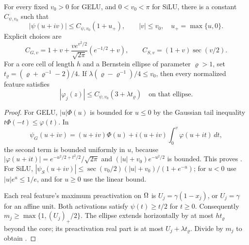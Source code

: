 \begin{lemma}
\label{lem:psi-strip-growth}
For every fixed $v_0>0$ for GELU, and $0<v_0<\pi$ for SiLU, there is a
constant $C_{\psi,v_0}$ such that
\begin{equation}
 |\psi(u+iv)|\le C_{\psi,v_0}(1+u_+),\qquad |v|\le v_0,
 \quad u_+=\max\{u,0\}.
 \label{eq:psi-strip-growth}
\end{equation}
Explicit choices are
\begin{equation}
 C_{G,v}=1+v+\frac{v e^{v^2/2}}{\sqrt{2\pi}}(e^{-1/2}+v),
 \qquad C_{S,v}=(1+v)\sec(v/2).
 \label{eq:psi-strip-constants}
\end{equation}
For a core cell of length $h$ and a Bernstein ellipse of parameter
$\varrho>1$, set $t_\varrho=(\varrho+\varrho^{-1}-2)/4$.
If $\lambda(\varrho-\varrho^{-1})/4\le v_0$, then every normalized feature
satisfies
\begin{equation}
 |\varphi_j(z)|\le C_{\psi,v_0}(3+\lambda t_\varrho)
 \quad\text{on that ellipse}.
 \label{eq:psi-ellipse-bound}
\end{equation}
\end{lemma}
\begin{proof}
For GELU, $|u|\Phi(u)$ is bounded for $u\le0$ by the Gaussian tail
inequality $t\Phi(-t)\le\varphi(t)$. In
\[
 \psi_G(u+iv)=(u+iv)\Phi(u)
        +i(u+iv)\int_0^v\varphi(u+it)\,dt,
\]
the second term is bounded uniformly in $u$, because
$|\varphi(u+it)|=e^{-u^2/2+t^2/2}/\sqrt{2\pi}$ and
$(|u|+v_0)e^{-u^2/2}$ is bounded. This proves .
For SiLU,
$|\psi_S(u+iv)|\le\sec(v_0/2)(|u|+v_0)/(1+e^{-u})$;
for $u<0$ use $|u|e^{u}\le1/e$, and for $u\ge0$ use the linear bound.

Each real feature's maximum preactivation on $\Omega$ is $U_j=\gamma(1-x_j)$,
or $U_j=\gamma$ for an affine unit. Both activations satisfy
$\psi(t)\ge t/2$ for $t\ge0$. Consequently
$m_j\ge\max\{1,(U_j)_+/2\}$. The ellipse extends horizontally by at most
$h t_\varrho$ beyond the core; its preactivation real part is at most
$U_j+\lambda t_\varrho$. Divide  by $m_j$ to
obtain .
\end{proof}

